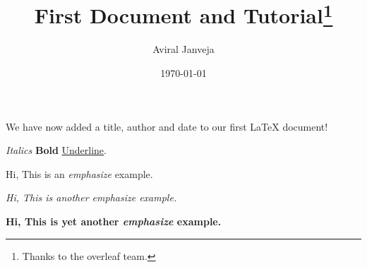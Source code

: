 \documentclass[12pt, letterpaper, twoside]{article}
\title{First Document and Tutorial\thanks{Thanks to the overleaf team.}}
\author{Aviral Janveja}
\date{\today}
\begin{document}
 

\maketitle 

\tableofcontents

We have now added a title, author and date to our first \LaTeX{} document!


\textit{Italics}
\textbf{Bold}
\underline{Underline}.

Hi, This is an \emph{emphasize} example.

\textit{Hi, This is another \emph{emphasize} example.}

\textbf{Hi, This is yet another \emph{emphasize} example.}
\end{document}
